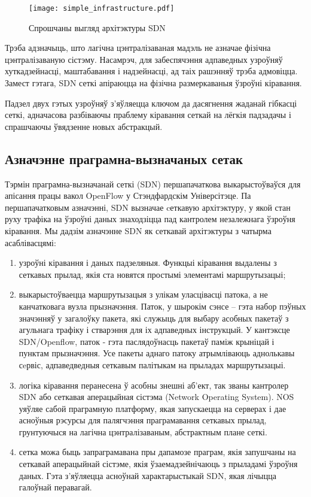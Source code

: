 \clearpage

\begin{figure}[ht!]
    \centering
    \texttt{[image: simple\_infrastructure.pdf]}
    \vspace{-\baselineskip}
    \caption{Спрошчаны выгляд архітэктуры SDN}
    \label{img: Simple Infrastructure}
\end{figure}

Трэба адзначыць, што лагічна цэнтралізаваная мадэль не азначае фізічна цэнтралізаваную сістэму.
Насамрэч, для забеспячэння адпаведных узроўняў хуткадзейнасці, маштабавання і надзейнасці,
ад таіх рашэнняў трэба адмовіцца. Замест гэтага, SDN сеткі апіраюцца на фізічна размеркаваныя
ўзроўні кіравання.

Падзел двух гэтых узроўняў з'яўляецца ключом да дасягнення жаданай гібкасці сеткі,
адначасова разбіваючы праблему кіравання сеткай на лёгкія падзадачы і спрашчаючы ўвядзенне новых абстракцый.

\subsection{Азначэнне праграмна-вызначаных сетак}

Тэрмін праграмна-вызначанай сеткі (SDN) першапачаткова выкарыстоўваўся для апісання
працы вакол OpenFlow у Стэндфардскім Універсітэце.
Па першапачатковым азначэнні, SDN вызначае
cеткавую архітэктуру, у якой стан руху трафіка на ўзроўні даных
знаходзіцца пад кантролем  незалежнага ўзроўня кіравання.
Мы дадзім азначэнне SDN як сеткавай архітэктуры з
чатырма асаблівасцямі:
\begin{enumerate}
    \item узроўні кіравання і даных падзеляныя. Функцыі кіравання выдалены з сеткавых прылад, якія ста
новятся простымі элементамі маршрутызацыі;
    \item выкарыстоўваецца маршрутызацыя з улікам уласцівасці патока, а не канчатковага вузла прызначэння. Паток, у шырокім сэнсе -- гэта набор пэўных значэнняў у загалоўку пакета,
які служыць для выбару асобных пакетаў з агульнага трафіку і стварэння для іх адпаведных інструкцый.
У кантэксце SDN/Openflow, паток - гэта паслядоўнасць пакетаў паміж крыніцай і пунктам прызначэння.
Усе пакеты аднаго патоку атрымліваюць аднолькавы сeрвіс, адпаведведныя сеткавым палітыкам на прыладах маршрутызацыі.
    \item логіка кіравання перанесена ў асобны знешні аб'ект, так званы кантролер SDN або сеткавая аперацыйная сістэма (Network Operating System). NOS уяўляе сабой праграмную платформу, якая запускаецца на серверах і дае асноўныя рэсурсы для палягчэння праграмавання сеткавых прылад, грунтуючыся на лагічна
цэнтралізаваным, абстрактным плане сеткі.
    \item сетка можа быць запраграмавана пры дапамозе праграм, якія запушчаны на
    сеткавай аперацыйнай сістэме, якія ўзаемадзейнічаюць з прыладамі ўзроўня даных.
    Гэта з'яўляецца асноўнай характарыстыкай SDN, якая лічыцца галоўнай перавагай.
\end{enumerate}

